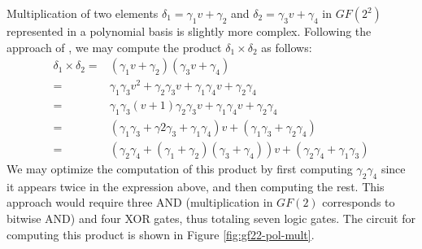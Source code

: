 Multiplication of two elements $\delta_1 = \gamma_1 v + \gamma_2$ and  $\delta_2 = \gamma_3 v + \gamma_4$ in $GF(2^2)$ represented in a polynomial basis is slightly more complex. Following the approach of \cite{Satoh01-1}, we may compute the product $\delta_1 \times \delta_2$ as follows:
\begin{align*}
\delta_1 \times \delta_2 = & (\gamma_1 v + \gamma_2)(\gamma_3 v + \gamma_4) \\
= & \gamma_1\gamma_3v^2 + \gamma_2\gamma_3 v + \gamma_1\gamma_4 v + \gamma_2\gamma_4 \\
= & \gamma_1\gamma_3(v + 1) \gamma_2\gamma_3 v + \gamma_1\gamma_4 v + \gamma_2\gamma_4 \\
= & (\gamma_1\gamma_3 + \gamma2\gamma_3 + \gamma_1\gamma_4)v + (\gamma_1\gamma_3 + \gamma_2\gamma_4) \\
= & (\gamma_2\gamma_4 + (\gamma_1 + \gamma_2)(\gamma_3 + \gamma_4))v + (\gamma_2\gamma_4 + \gamma_1\gamma_3)
\end{align*}
We may optimize the computation of this product by first computing $\gamma_2\gamma_4$ since it appears twice in the expression above, and then computing the rest. This approach would require three AND (multiplication in $GF(2)$ corresponds to bitwise AND) and four XOR gates, thus totaling seven logic gates. The circuit for computing this product is shown in Figure \ref{fig:gf22-pol-mult}. 

